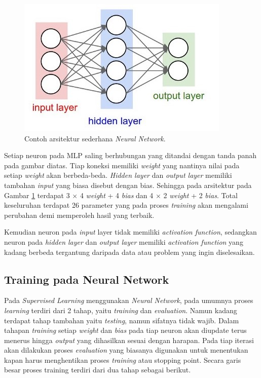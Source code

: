 \begin{figure} [!h] \centering
	\includegraphics[scale=0.9]{img/ann_arch.jpeg}
	\caption{Contoh arsitektur sederhana \textit{Neural Network}.}
	\label{fig:ann_arch}
\end{figure}

Setiap neuron pada MLP saling berhubungan yang ditandai dengan tanda panah pada gambar diatas. Tiap koneksi memiliki \textit{weight} yang nantinya nilai pada setiap \textit{weight} akan berbeda-beda. \textit{Hidden layer} dan \textit{output layer} memiliki tambahan \textit{input} yang biasa disebut dengan bias. Sehingga pada arsitektur pada Gambar \ref{fig:ann_arch} terdapat 3 $\times$ 4 \textit{weight} + 4 \textit{bias} dan 4 $\times$ 2 \textit{weight} + 2 \textit{bias}. Total keseluruhan terdapat 26 parameter yang pada proses \textit{training} akan mengalami perubahan demi memperoleh hasil yang terbaik.
\vspace{1ex}

Kemudian neuron pada \textit{input} layer tidak memiliki \textit{activation function}, sedangkan neuron pada \textit{hidden layer} dan \textit{output layer} memiliki \textit{activation function} yang kadang berbeda tergantung daripada data atau problem yang ingin diselesaikan.
\vspace{1ex}

\subsection{Training pada Neural Network}
\label{sec:sub_sec2_nn_train}

Pada \textit{Supervised Learning} menggunakan \textit{Neural Network}, pada umumnya proses \textit{learning} terdiri dari 2 tahap, yaitu \textit{training} dan \textit{evaluation}. Namun kadang terdapat tahap tambahan yaitu \textit{testing}, namun sifatnya tidak wajib. Dalam tahapan \textit{training} setiap \textit{weight} dan \textit{bias} pada tiap neuron akan diupdate terus menerus hingga \textit{output} yang dihasilkan sesuai dengan harapan. Pada tiap iterasi akan dilakukan proses \textit{evaluation} yang biasanya digunakan untuk menentukan kapan harus menghentikan proses \textit{training} atau stopping point. Secara garis besar proses training terdiri dari dua tahap sebagai berikut.
\vspace{1ex}

